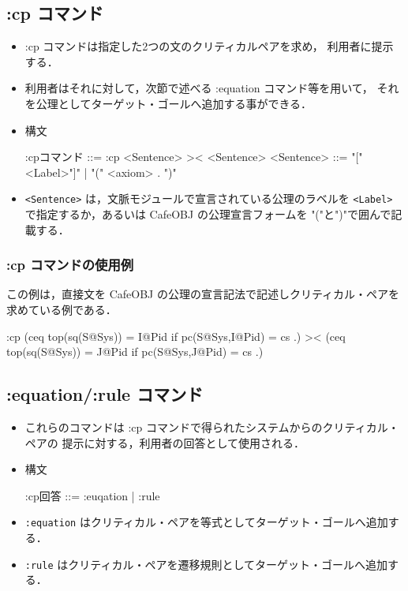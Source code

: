 \documentclass[a4paper,oneside,10pt,here]{memoir}
\newenvironment{vvtm}%
{\parskip=0pt\lineskip=0pt\begin{center}\begin{minipage}{0.8\textwidth}\begin{snugshade}}%
  {\end{snugshade}\end{minipage}\end{center}}
\begin{document}
\subsection{:cp コマンド}

\begin{itemize}
\item :cp コマンドは指定した2つの文のクリティカルペアを求め，
  利用者に提示する．
\item 利用者はそれに対して，次節で述べる :equation コマンド等を用いて，
  それを公理としてターゲット・ゴールへ追加する事ができる．
\item 構文
  \begin{vvtm}
    \begin{simplev}
      :cpコマンド ::= :cp <Sentence> >< <Sentence>
      <Sentence>  ::= "["<Label>"]" | "(" <axiom> . ")"
    \end{simplev}
  \end{vvtm}
\item \verb|<Sentence>| は，文脈モジュールで宣言されている公理のラベルを
  \verb|<Label>| で指定するか，あるいは CafeOBJ の公理宣言フォームを
  "("と")"で囲んで記載する．
\end{itemize}

\subsubsection{:cp コマンドの使用例}
この例は，直接文を CafeOBJ の公理の宣言記法で記述しクリティカル・ペアを
求めている例である．
\begin{vvtm}
  \begin{simplev}
:cp (ceq top(sq(S@Sys)) = I@Pid if pc(S@Sys,I@Pid) = cs .) 
    >< 
    (ceq top(sq(S@Sys)) = J@Pid if pc(S@Sys,J@Pid) = cs .)
  \end{simplev}
\end{vvtm}

\subsection{:equation/:rule コマンド}

\begin{itemize}
\item これらのコマンドは :cp コマンドで得られたシステムからのクリティカル・ペアの
  提示に対する，利用者の回答として使用される．
\item 構文
  \begin{vvtm}
    \begin{simplev}
      :cp回答 ::= :euqation | :rule
    \end{simplev}
  \end{vvtm}
\item \verb|:equation| はクリティカル・ペアを等式としてターゲット・ゴールへ追加する．
\item \verb|:rule| はクリティカル・ペアを遷移規則としてターゲット・ゴールへ追加する．
\end{itemize}
\end{document}
